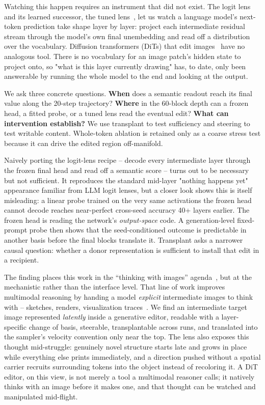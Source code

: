 \documentclass[10pt,twocolumn,letterpaper]{article}
\begin{document}
Watching this happen requires an instrument that did not exist. The
logit lens~\citep{nostalgebraist2020logitlens} and its learned
successor, the tuned lens~\citep{belrose2023tuned}, let us watch a
language model's next-token prediction take shape layer by layer:
project each intermediate residual stream through the model's own final
unembedding and read off a distribution over the vocabulary. Diffusion
transformers (DiTs) that edit
images~\citep{peebles2023dit,qwen2025image} have no analogous tool.
There is no vocabulary for an image patch's hidden state to project
onto, so "what is this layer currently drawing" has, to date, only been
answerable by running the whole model to the end and looking at the
output.

We ask three concrete questions. \textbf{When} does a semantic readout
reach its final value along the 20-step trajectory? \textbf{Where} in the
60-block depth can a frozen head, a fitted probe, or a tuned lens read the
eventual edit? \textbf{What can intervention establish?} We use
transplant to test sufficiency and steering to test writable content.
Whole-token ablation is retained only as a coarse stress test because it
can drive the edited region off-manifold.

Naively porting the logit-lens recipe -- decode every intermediate layer
through the frozen final head and read off a semantic score -- turns out
to be necessary but not sufficient. It reproduces the standard mid-layer
"nothing happens yet" appearance familiar from LLM logit lenses, but a
closer look shows this is itself misleading: a linear probe trained on
the very same activations the frozen head cannot decode reaches near-perfect
cross-seed accuracy 40+ layers earlier. The frozen head is reading the
network's \emph{output-space} code. A generation-level fixed-prompt probe
then shows that the seed-conditioned outcome is predictable in another
basis before the final blocks translate it. Transplant asks a narrower
causal question: whether a donor representation is sufficient to install
that edit in a recipient.

The finding places this work in the ``thinking with
images'' agenda~\citep{su2025thinkingsurvey}, but at the mechanistic
rather than the interface level. That line of work improves multimodal
reasoning by handing a model \emph{explicit} intermediate images to
think with -- sketches, renders, visualization
traces~\citep{hu2024sketchpad,menon2024whiteboard,wu2024vot,li2025mvot,openai2025thinking}.
We find an intermediate target image represented \emph{latently} inside
a generative editor, readable with a layer-specific change of basis,
steerable, transplantable across runs, and translated into the sampler's
velocity convention only near the top. The lens also
exposes this thought mid-struggle: genuinely novel structure starts
late and grows in place while everything else prints immediately, and a
direction pushed without a spatial carrier recruits surrounding tokens
into the object instead of recoloring it. A DiT editor, on this view,
is not merely a tool a multimodal reasoner calls; it natively thinks
with an image before it makes one, and that thought can be watched and
manipulated mid-flight.
\end{document}
